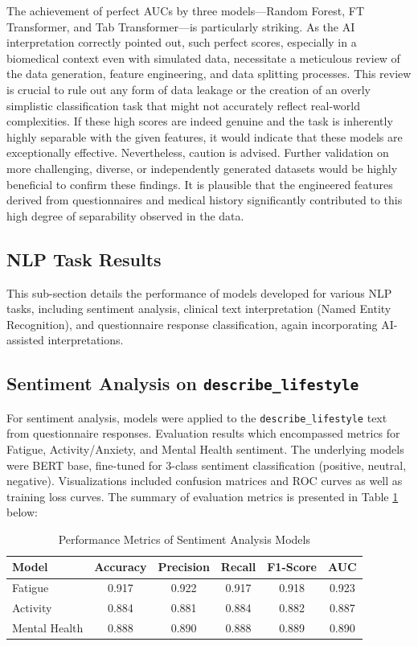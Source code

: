 The achievement of perfect AUCs by three models—Random Forest, FT Transformer, and Tab Transformer—is particularly striking. As the AI interpretation correctly pointed out, such perfect scores, especially in a biomedical context even with simulated data, necessitate a meticulous review of the data generation, feature engineering, and data splitting processes. This review is crucial to rule out any form of data leakage or the creation of an overly simplistic classification task that might not accurately reflect real-world complexities. If these high scores are indeed genuine and the task is inherently highly separable with the given features, it would indicate that these models are exceptionally effective. Nevertheless, caution is advised. Further validation on more challenging, diverse, or independently generated datasets would be highly beneficial to confirm these findings. It is plausible that the engineered features derived from questionnaires and medical history significantly contributed to this high degree of separability observed in the data.

\subsection{NLP Task Results}

This sub-section details the performance of models developed for various NLP tasks, including sentiment analysis, clinical text interpretation (Named Entity Recognition), and questionnaire response classification, again incorporating AI-assisted interpretations.

\subsection{Sentiment Analysis on \texttt{describe\_lifestyle}}

For sentiment analysis, models were applied to the \texttt{describe\_lifestyle} text from questionnaire responses. Evaluation results which encompassed metrics for Fatigue, Activity/Anxiety, and Mental Health sentiment. The underlying models were BERT base, fine-tuned for 3-class sentiment classification (positive, neutral, negative). Visualizations included confusion matrices and ROC curves as well as training loss curves. The summary of evaluation metrics is presented in Table \ref{tab:sentiment_analysis_performance} below:

\begin{table}[htbp]
    \centering
    \caption{Performance Metrics of Sentiment Analysis Models}
    \label{tab:sentiment_analysis_performance}
    \begin{tabular}{lccccc}
        \hline
        \textbf{Model} & \textbf{Accuracy} & \textbf{Precision} & \textbf{Recall} & \textbf{F1-Score} & \textbf{AUC} \\
        \hline
        Fatigue & 0.917 & 0.922 & 0.917 & 0.918 & 0.923 \\
        Activity & 0.884 & 0.881 & 0.884 & 0.882 & 0.887 \\
        Mental Health & 0.888 & 0.890 & 0.888 & 0.889 & 0.890 \\
        \hline
    \end{tabular}
\end{table}

